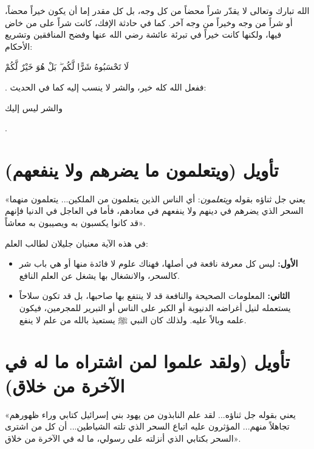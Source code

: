 \begin{fawaid}
الله تبارك وتعالى لا يقدّر شراً محضاً من كل وجه، بل كل مقدر إما أن يكون خيراً محضاً، أو شراً من وجه وخيراً من وجه آخر. كما في حادثة الإفك، كانت شراً على من خاض فيها، ولكنها كانت خيراً في تبرئة عائشة رضي الله عنها وفضح المنافقين وتشريع الأحكام: \begin{ayah}لَا تَحْسَبُوهُ شَرًّا لَّكُم ۖ بَلْ هُوَ خَيْرٌ لَّكُمْ\end{ayah}. ففعل الله كله خير، والشر لا ينسب إليه كما في الحديث: \begin{hadith}والشر ليس إليك\end{hadith}.
\end{fawaid}

\separator

\section{تأويل (ويتعلمون ما يضرهم ولا ينفعهم)}
 «يعني جل ثناؤه بقوله \textit{ويتعلمون}: أي الناس الذين يتعلمون من الملكين... يتعلمون منهما السحر الذي يضرهم في دينهم ولا ينفعهم في معادهم، فأما في العاجل في الدنيا فإنهم قد كانوا يكسبون به ويصيبون به معاشاً».

\begin{fawaid}
في هذه الآية معنيان جليلان لطالب العلم:
\begin{itemize}
    \item \textbf{الأول:} ليس كل معرفة نافعة في أصلها، فهناك علوم لا فائدة منها أو هي باب شر كالسحر، والانشغال بها يشغل عن العلم النافع.
    \item \textbf{الثاني:} المعلومات الصحيحة والنافعة قد لا ينتفع بها صاحبها، بل قد تكون سلاحاً يستعمله لنيل أغراضه الدنيوية أو الكبر على الناس أو التبرير للمجرمين، فيكون علمه وبالاً عليه. ولذلك كان النبي ﷺ يستعيذ بالله من علم لا ينفع.
\end{itemize}
\end{fawaid}

\separator

\section{تأويل (ولقد علموا لمن اشتراه ما له في الآخرة من خلاق)}
 «يعني بقوله جل ثناؤه... لقد علم النابذون من يهود بني إسرائيل كتابي وراء ظهورهم تجاهلاً منهم... المؤثرون عليه اتباع السحر الذي تلته الشياطين... أن كل من اشترى السحر بكتابي الذي أنزلته على رسولي، ما له في الآخرة من خلاق».

